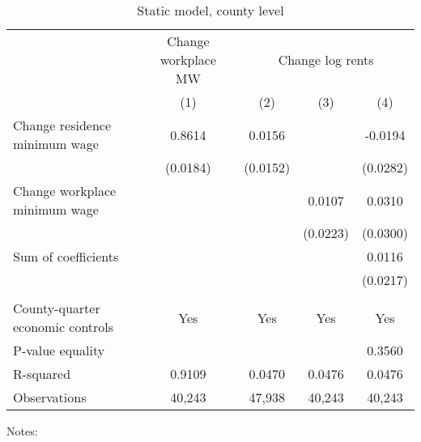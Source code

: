 \begin{table}
    \caption{Static model, county level}
    \label{tab:static_county}

    \begin{tabular}{l*{4}{c}}
    \toprule
                                        & \multicolumn{1}{c}{Change workplace MW}
                                        & \multicolumn{3}{c}{Change log rents}  \\ \cmidrule(lr){2-2}\cmidrule(lr){3-5}
                                              & (1)   & (2)   & (3)   & (4)      \\ \midrule
    Change residence minimum wage             &  0.8614  &  0.0156  &       &  -0.0194     \\
                                              & (0.0184) & (0.0152) &       & (0.0282)    \\
    Change workplace minimum wage             &       &       &  0.0107  & 0.0310      \\
                                              &       &       & (0.0223) & (0.0300)    \\ \midrule
    Sum of coefficients                       &       &       &       &  0.0116     \\
                                              &       &       &       & (0.0217)    \\
                                              &       &       &       &          \\ \midrule
    County-quarter economic controls          &  Yes  & Yes   & Yes   & Yes      \\
    P-value equality                          &       &       &       & 0.3560      \\
    R-squared                                 &  0.9109  &  0.0470  &  0.0476  & 0.0476      \\
    Observations                              & 40,243  & 47,938  & 40,243  & 40,243     \\\bottomrule
    \end{tabular}

    \begin{minipage}{.95\textwidth} \footnotesize
        \vspace{2mm}
        Notes: 
    \end{minipage}
\end{table}
